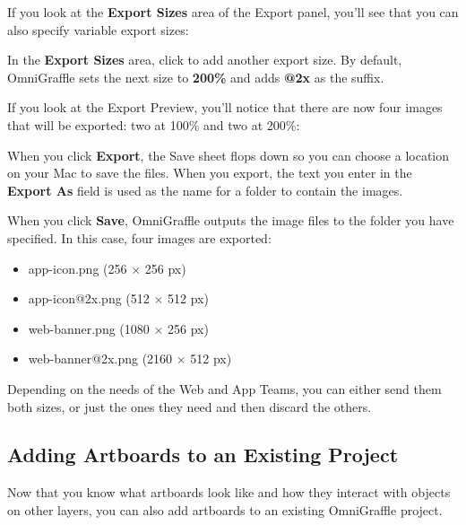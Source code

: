 \documentclass[../main.tex]{subfiles}
\begin{document}
If you look at the \textbf{Export Sizes} area of the Export panel, you'll see that you can also
specify variable export sizes:


In the \textbf{Export Sizes} area, click  to
add another export size. By default, OmniGraffle sets the next size to \textbf{200\%} and adds
\textbf{@2x} as the suffix.


If you look at the Export Preview, you'll notice that there are now four images that will be
exported: two at 100\% and two at 200\%:


When you click \textbf{Export}, the Save sheet flops down so you can choose a location on your
Mac to save the files. When you export, the text you enter in the \textbf{Export As} field is
used as the name for a folder to contain the images.


When you click \textbf{Save}, OmniGraffle outputs the image files to the folder you have
specified. In this case, four images are exported:

\begin{itemize}
  \item app-icon.png (256 $\times$ 256 px)
  \item app-icon@2x.png (512 $\times$ 512 px)
  \item web-banner.png (1080 $\times$ 256 px)
  \item web-banner@2x.png (2160 $\times$ 512 px)
\end{itemize}


Depending on the needs of the Web and App Teams, you can either send them both sizes, or just
the ones they need and then discard the others.

\subsection{Adding Artboards to an Existing Project}

Now that you know what artboards look like and how they interact with objects on other layers,
you can also add artboards to an existing OmniGraffle project.
\end{document}
